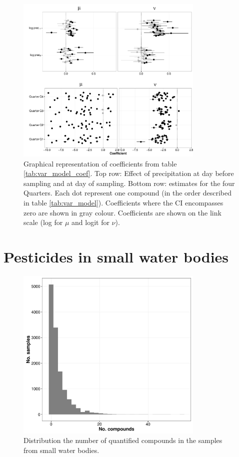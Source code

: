 \documentclass[pdftex,a4paper]{scrreprt}
\begin{document}
\begin{figure}[h]
	\centering
	\includegraphics[width = 0.8\textwidth]{coefs}
	\caption[Graphical representation of coefficients from table \ref{tab:var_model_coef}.]{Graphical representation of coefficients from table \ref{tab:var_model_coef}. Top row: Effect of precipitation at day before sampling and at day of sampling. Bottom row: estimates for the four Quarters. Each dot represent one compound (in the order described in table \ref{tab:var_model}). Coefficients where the CI encompasses zero are shown in gray colour. Coefficients are shown on the link scale (log for $\mu$ and logit for $\nu$).}
	\label{fig:coefs}
\end{figure}



\chapter{Pesticides in small water bodies}

\begin{figure}[h]
	\centering
	\includegraphics[width = 0.8\textwidth]{pmix}
	\caption{Distribution the number of quantified compounds in the samples from small water bodies.}
	\label{fig:pmix}
\end{figure}
\end{document}
